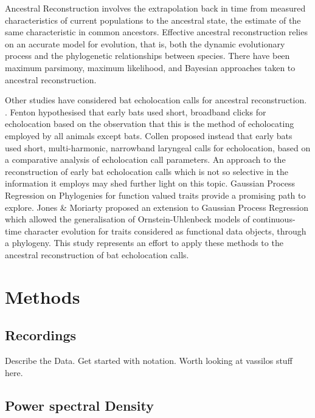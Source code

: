 \documentclass{ws-rv9x6}
\begin{document}
Ancestral Reconstruction involves the extrapolation back in time from measured characteristics of current populations to the ancestral state, the estimate of the same characteristic in common ancestors.\cite{joy2016ancestral} Effective ancestral reconstruction relies on an accurate model for evolution, that is, both the dynamic evolutionary process and the phylogenetic relationships between species. \cite{joy2016ancestral} There have been maximum parsimony\cite{fitch1971toward}, maximum likelihood\cite{pupko2000fast}, and Bayesian\cite{pagel2004bayesian} approaches taken to ancestral reconstruction.

Other studies have considered bat echolocation calls for ancestral reconstruction. \cite{fenton1995signal} \cite{collen2012evolution}. Fenton\cite{fenton1995signal} hypothesised that early bats used short, broadband clicks for echolocation based on the observation that this is the method of echolocating employed by all animals except bats. Collen\cite{collen2012evolution} proposed instead that early bats used short, multi-harmonic, narrowband laryngeal calls for echolocation, based on a comparative analysis of echolocation call parameters. An approach to the reconstruction of early bat echolocation calls which is not so selective in the information it employs may shed further light on this topic. Gaussian Process Regression on Phylogenies for function valued traits provide a promising path to explore.\cite{jones2013evolutionary} Jones \& Moriarty proposed an extension to Gaussian Process Regression\cite{rasmussen2006gaussian} which allowed the generalisation of Ornstein-Uhlenbeck\cite{uhlenbeck1930theory} models of continuous-time character evolution for traits considered as functional data objects,\cite{ramsay2006functional} through a phylogeny. This study represents an effort to apply these methods to the ancestral reconstruction of bat echolocation calls.

\section{Methods}

\subsection{Recordings}

Describe the Data. Get started with notation. Worth looking at vassilos stuff here.

\subsection{Power spectral Density}
\end{document}

